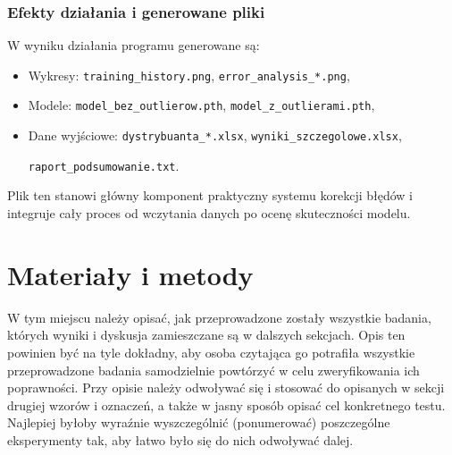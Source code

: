 \documentclass{classrep}
\begin{document}
\subsubsection*{Efekty działania i generowane pliki}

W wyniku działania programu generowane są:

\begin{itemize}
	\item Wykresy: \texttt{training\_history.png}, \texttt{error\_analysis\_*.png},
	\item Modele: \texttt{model\_bez\_outlierow.pth}, \texttt{model\_z\_outlierami.pth},
	\item Dane wyjściowe: \texttt{dystrybuanta\_*.xlsx}, \texttt{wyniki\_szczegolowe.xlsx},

	      \texttt{raport\_podsumowanie.txt}.
\end{itemize}

Plik ten stanowi główny komponent praktyczny systemu korekcji błędów i integruje cały proces od wczytania danych po ocenę skuteczności modelu.

\section{Materiały i metody}
 {\color{blue}
  W tym miejscu należy opisać, jak przeprowadzone zostały wszystkie badania,
  których wyniki i dyskusja zamieszczane są w dalszych sekcjach. Opis ten
  powinien być na tyle dokładny, aby osoba czytająca go potrafiła wszystkie
  przeprowadzone badania samodzielnie powtórzyć w celu zweryfikowania ich
  poprawności. Przy opisie należy odwoływać się i stosować do
  opisanych w sekcji drugiej wzorów i oznaczeń, a także w jasny sposób opisać
  cel konkretnego testu. Najlepiej byłoby wyraźnie wyszczególnić (ponumerować)
  poszczególne eksperymenty tak, aby łatwo było się do nich odwoływać dalej.}

\clearpage{}
\end{document}
